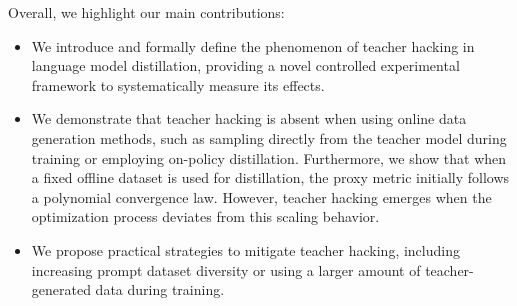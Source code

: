 Overall, we highlight our main contributions:
\begin{itemize}[itemsep=2pt,leftmargin=10pt]
    \item We introduce and formally define the phenomenon of teacher hacking in language model distillation, providing a novel controlled experimental framework to systematically measure its effects.
    \item We demonstrate that teacher hacking is absent when using online data generation methods, such as sampling directly from the teacher model during training or employing on-policy distillation. Furthermore, we show that when a fixed offline dataset is used for distillation, the proxy metric initially follows a polynomial convergence law. However, teacher hacking emerges when the optimization process deviates from this scaling behavior.
    \item We propose practical strategies to mitigate teacher hacking, including increasing prompt dataset diversity or using a larger amount of teacher-generated data during training.
\end{itemize}
